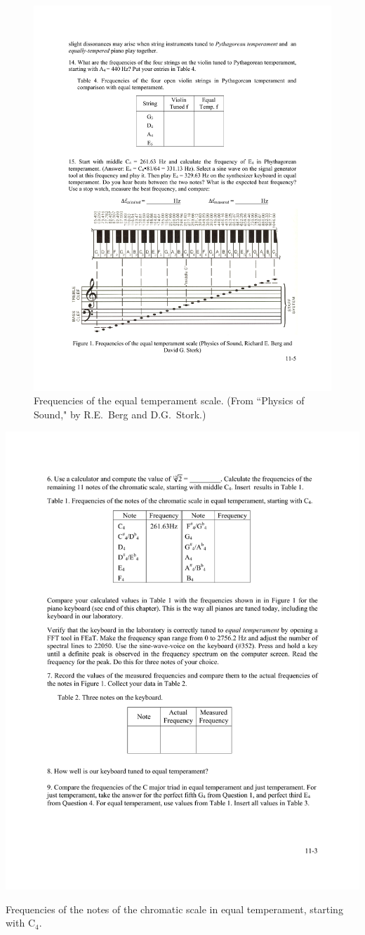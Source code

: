 \documentclass[11pt]{NSF}
\begin{document}
%
\begin{figure}[hbtp]
\begin{center}
\includegraphics[width=.95\textwidth]{fig11_1}
\caption{Frequencies of the equal temperament scale.
(From ``Physics of Sound," by R.E.~Berg and D.G.~Stork.)}
\label{f:1}
\end{center}
\end{figure}
%
%
\begin{table}[hbtp]
\begin{center}
\includegraphics[width=.45\textwidth]{tab11_1}
\caption{Frequencies of the notes of the chromatic scale in equal 
temperament, starting with C$_4$.}
\label{t:1}
\end{center}
\end{table}
%
\end{document}
